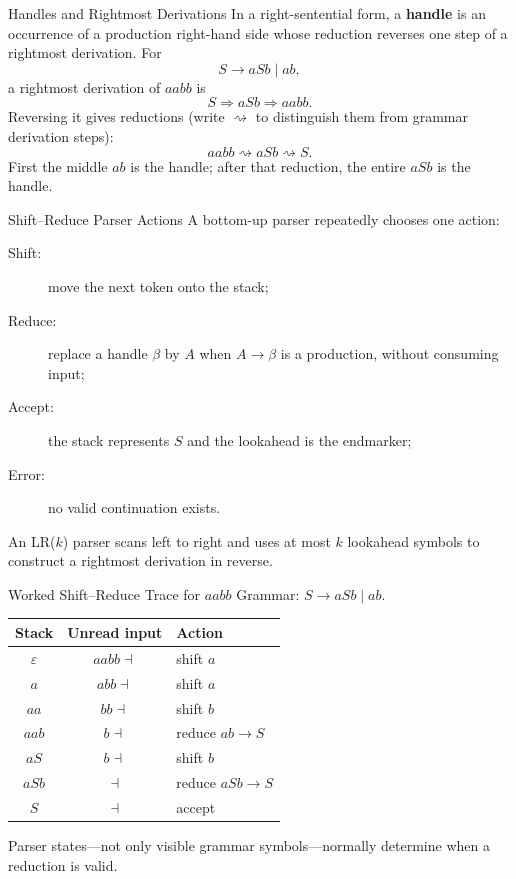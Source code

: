 \documentclass[10pt]{beamer}
\begin{document}
\begin{frame}{Handles and Rightmost Derivations}
  \small
  In a right-sentential form, a \textbf{handle} is an occurrence of a production right-hand side whose
  reduction reverses one step of a rightmost derivation.
  For
  \[
    S\to aSb\mid ab,
  \]
  \pause
  a rightmost derivation of $aabb$ is
  \[
    S\Rightarrow aSb\Rightarrow aabb.
  \]
  Reversing it gives reductions (write $\rightsquigarrow$ to distinguish
  them from grammar derivation steps):
  \[
    aabb\rightsquigarrow aSb\rightsquigarrow S.
  \]
  First the middle $ab$ is the handle; after that reduction, the entire $aSb$ is the handle.
\end{frame}

\begin{frame}{Shift--Reduce Parser Actions}
  A bottom-up parser repeatedly chooses one action:
  \begin{description}
    \item[Shift:] move the next token onto the stack;
    \item[Reduce:] replace a handle $\beta$ by $A$ when $A\to\beta$ is a
      production, without consuming input;
    \item[Accept:] the stack represents $S$ and the lookahead is the endmarker;
    \item[Error:] no valid continuation exists.
  \end{description}
  An LR($k$) parser scans left to right and uses at most $k$ lookahead symbols to construct a rightmost
  derivation in reverse.
\end{frame}

\begin{frame}{Worked Shift--Reduce Trace for $aabb$}
  Grammar: $S\to aSb\mid ab$.
  \begin{center}
  \begin{tabular}{ccl}
    \toprule
    Stack & Unread input & Action \\
    \midrule
    $\varepsilon$ & $aabb\dashv$ & shift $a$ \\
    $a$ & $abb\dashv$ & shift $a$ \\
    $aa$ & $bb\dashv$ & shift $b$ \\
    $aab$ & $b\dashv$ & reduce $ab\to S$ \\
    $aS$ & $b\dashv$ & shift $b$ \\
    $aSb$ & $\dashv$ & reduce $aSb\to S$ \\
    $S$ & $\dashv$ & accept \\
    \bottomrule
  \end{tabular}
  \end{center}
  Parser states—not only visible grammar symbols—normally determine when a reduction is valid.
\end{frame}
\end{document}
